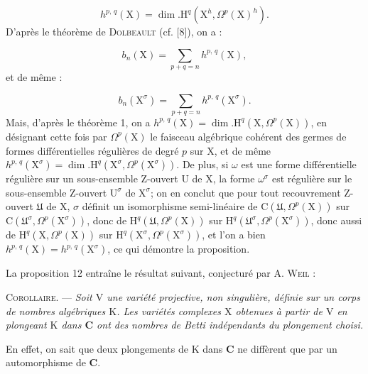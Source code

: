 \begin{equation*}
h^{p,\,q}(\mathrm{X}) = \dim. \mathrm{H}^q(\mathrm{X}^h, \Omega^p(\mathrm{X})^h).
\end{equation*}
D'après le théorème de \textsc{Dolbeault} (cf. [8]), on a :

\begin{equation*}
b_n(\mathrm{X}) = \sum_{p + q = n} h^{p,\,q}(\mathrm{X}),
\end{equation*}
et de même :

\begin{equation*}
b_n(\mathrm{X}^\sigma) = \sum_{p + q = n} h^{p,\,q}(\mathrm{X}^\sigma).
\end{equation*}
Mais, d'après le théorème 1, on a $h^{p,\,q}(\mathrm{X}) = \dim. \mathrm{H}^q(\mathrm{X}, \Omega^p(\mathrm{X}))$, en désignant cette fois par $\Omega^p(\mathrm{X})$ le faisceau algébrique cohérent des germes de formes différentielles régulières de degré $p$ sur $\mathrm{X}$, et de même $h^{p,\,q}(\mathrm{X}^\sigma) = \dim. \mathrm{H}^q(\mathrm{X}^\sigma, \Omega^p(\mathrm{X}^\sigma))$. De plus, si $\omega$ est une forme différentielle régulière sur un sous-ensemble Z-ouvert $\mathrm{U}$ de $\mathrm{X}$, la forme $\omega^\sigma$ est régulière sur le sous-ensemble Z-ouvert $\mathrm{U}^\sigma$ de $\mathrm{X}^\sigma$; on en conclut que pour tout recouvrement Z-ouvert $\mathfrak{U}$ de $\mathrm{X}$, $\sigma$ définit un isomorphisme semi-linéaire de $\mathrm{C}(\mathfrak{U}, \Omega^p(\mathrm{X}))$ sur $\mathrm{C}(\mathfrak{U}^\sigma, \Omega^p(\mathrm{X}^\sigma))$, donc de $\mathrm{H}^q(\mathfrak{U}, \Omega^p(\mathrm{X}))$ sur $\mathrm{H}^q(\mathfrak{U}^\sigma, \Omega^p(\mathrm{X}^\sigma))$, donc aussi de $\mathrm{H}^q(\mathrm{X}, \Omega^p(\mathrm{X}))$ sur $\mathrm{H}^q(\mathrm{X}^\sigma, \Omega^p(\mathrm{X}^\sigma))$, et l'on a bien $h^{p,\,q}(\mathrm{X}) = h^{p,\,q}(\mathrm{X}^\sigma)$, ce qui démontre la proposition.

La proposition 12 entraîne le résultat suivant, conjecturé par A. \textsc{Weil} :

\textsc{Corollaire}. --- \textit{Soit $\mathrm{V}$ une variété projective, non singulière, définie sur un corps de nombres algébriques $\mathrm{K}$. Les variétés complexes $\mathrm{X}$ obtenues à partir de $\mathrm{V}$ en plongeant $\mathrm{K}$ dans $\mathbf{C}$ ont des nombres de Betti indépendants du plongement choisi.}

En effet, on sait que deux plongements de $\mathrm{K}$ dans $\mathbf{C}$ ne diffèrent que par un automorphisme de $\mathbf{C}$.


